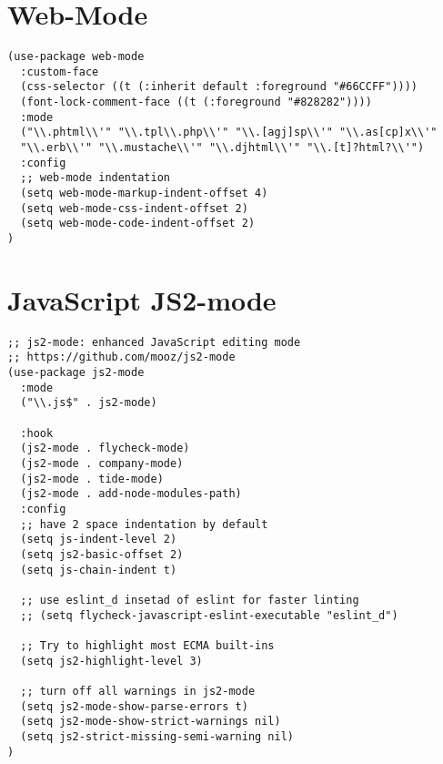 \documentclass[11pt]{article}
\begin{document}
\section*{Web-Mode}
\label{sec:orgb0c42bb}
\begin{verbatim}
(use-package web-mode
  :custom-face
  (css-selector ((t (:inherit default :foreground "#66CCFF"))))
  (font-lock-comment-face ((t (:foreground "#828282"))))
  :mode
  ("\\.phtml\\'" "\\.tpl\\.php\\'" "\\.[agj]sp\\'" "\\.as[cp]x\\'"
  "\\.erb\\'" "\\.mustache\\'" "\\.djhtml\\'" "\\.[t]?html?\\'")
  :config
  ;; web-mode indentation
  (setq web-mode-markup-indent-offset 4)
  (setq web-mode-css-indent-offset 2)
  (setq web-mode-code-indent-offset 2)
)
\end{verbatim}

\section*{JavaScript JS2-mode}
\label{sec:org23f2167}

\begin{verbatim}
;; js2-mode: enhanced JavaScript editing mode
;; https://github.com/mooz/js2-mode
(use-package js2-mode
  :mode
  ("\\.js$" . js2-mode)

  :hook
  (js2-mode . flycheck-mode)
  (js2-mode . company-mode)
  (js2-mode . tide-mode)
  (js2-mode . add-node-modules-path)
  :config
  ;; have 2 space indentation by default
  (setq js-indent-level 2)
  (setq js2-basic-offset 2)
  (setq js-chain-indent t)

  ;; use eslint_d insetad of eslint for faster linting
  ;; (setq flycheck-javascript-eslint-executable "eslint_d")

  ;; Try to highlight most ECMA built-ins
  (setq js2-highlight-level 3)

  ;; turn off all warnings in js2-mode
  (setq js2-mode-show-parse-errors t)
  (setq js2-mode-show-strict-warnings nil)
  (setq js2-strict-missing-semi-warning nil)
)
\end{verbatim}
\end{document}

